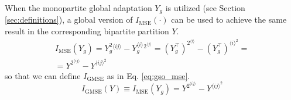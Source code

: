 \documentclass[conference]{IEEEtran}
\newcommand{\mel}[1]{^{\langle #1 \rangle}}
\begin{document}
When the monopartite global adaptation $Y_g$ is utilized (see Section \ref{sec:definitions}), a global version of $I_\text{MSE}(\cdot)$ can be used to achieve the same result in the corresponding bipartite partition $Y$.
%
\begin{multline*}
        I_\text{MSE}(Y_g)
            = Y_g^2\mel{ij} - Y_g\mel i^2\mel j
            = (Y_g^\intercal)^2\mel i - (Y_g^\intercal)\mel i^2 =\\
            = Y^2\mel{ij} - Y\mel{ij}^2
\end{multline*}
so that we can define $I_\text{GMSE}$ as in Eq. \ref{eq:gso_mse}.
\begin{equation}
    I_\text{GMSE}(Y) \equiv I_\text{MSE}(Y_g)
    = Y^2\mel{ij} - Y\mel{ij}^2
    \label{eq:gso_mse}
\end{equation}


\end{document}
